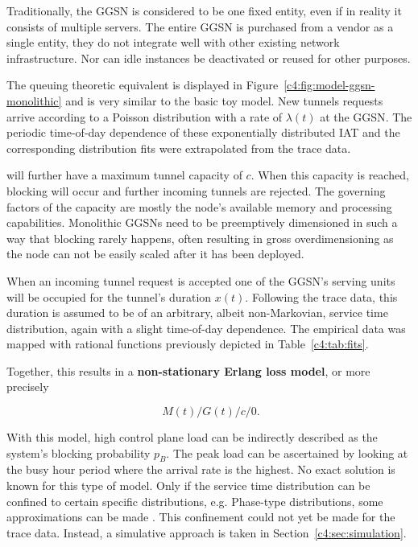 Traditionally, the \gls{GGSN} is considered to be one fixed entity, even if in reality it consists of multiple servers. The entire \gls{GGSN} is purchased from a vendor as a single entity, they do not integrate well with other existing network infrastructure. Nor can idle instances be deactivated or reused for other purposes.

The queuing theoretic equivalent is displayed in Figure~\ref{c4:fig:model-ggsn-monolithic} and is very similar to the basic toy model.
New tunnels requests arrive according to a Poisson distribution with a rate of $\lambda(t)$ at the \gls{GGSN}. The periodic time-of-day dependence of these exponentially distributed \gls{IAT} and the corresponding distribution fits were extrapolated from the trace data.

 will further have a maximum tunnel capacity of $c$. When this capacity is reached, blocking will occur and further incoming tunnels are rejected. The governing factors of the capacity are mostly the node's available memory and processing capabilities. Monolithic \glspl{GGSN} need to be preemptively dimensioned in such a way that blocking rarely happens, often resulting in gross overdimensioning as the node can not be easily scaled after it has been deployed.

When an incoming tunnel request is accepted one of the \gls{GGSN}'s serving units will be occupied for the tunnel's duration $x(t)$. Following the trace data, this duration is assumed to be of an arbitrary, albeit non-Markovian, service time distribution, again with a slight time-of-day dependence.
The empirical data was mapped with rational functions previously depicted in Table~\ref{c4:tab:fits}.

Together, this results in a \textbf{non-stationary Erlang loss model}, or more precisely

\begin{equation}
\phantom{.}M(t)/G(t)/c/0\text{.}
\end{equation}

With this model, high control plane load can be indirectly described as the system's blocking probability $p_B$. The peak load can be ascertained by looking at the busy hour period where the arrival rate is the highest. No exact solution is known for this type of model. Only if the service time distribution can be confined to certain specific distributions, e.g. Phase-type distributions, some approximations can be made \cite{davis1995nonstationaryerlang}. This confinement could not yet be made for the trace data. Instead, a simulative approach is taken in Section~\ref{c4:sec:simulation}.


